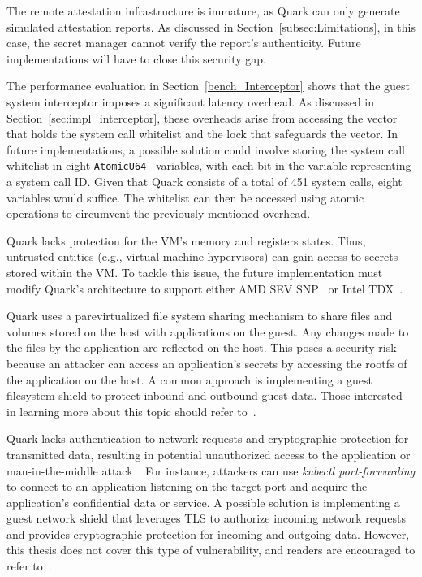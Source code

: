 The remote attestation infrastructure is immature, as Quark can only generate simulated attestation reports. As discussed in Section~\ref{subsec:Limitations}, in this case, the secret manager cannot verify the report's authenticity. Future implementations will have to close this security 
gap.

The performance evaluation in Section~\ref{bench_Interceptor} shows that the guest system interceptor imposes a significant latency overhead. As discussed in Section~\ref{sec:impl_interceptor}, these overheads arise from accessing the vector that holds the system call whitelist and the lock 
that safeguards the vector. In future implementations, a possible solution could involve storing the system call whitelist in eight \texttt{AtomicU64}~\cite*{rust_automic_u64} variables, with each bit in the variable representing a system call ID. Given that Quark consists of a total of 451 system calls, eight variables would suffice. The whitelist can then be accessed using atomic 
operations to circumvent the previously mentioned overhead.

Quark lacks protection for the VM's memory and registers states. Thus, untrusted entities (e.g., virtual machine hypervisors) can gain access to secrets stored within the VM. To tackle this issue, the future implementation must modify Quark's architecture to support either 
AMD SEV SNP~\cite*{SEV_SNP_white_book} or Intel TDX~\cite*{Intel_tdx_whitepaper}.

Quark uses a parevirtualized file system sharing mechanism to share files and volumes stored on the host with applications on the guest. Any changes made to the files by the application are reflected on the host. This poses a security risk because an attacker can access an application's secrets by 
accessing the rootfs of the application on the host. A common approach is implementing a guest filesystem shield to protect inbound and outbound guest data. Those interested in learning more about this topic should refer to~\cite*{file_system_shield}.

Quark lacks authentication to network requests and cryptographic protection for transmitted data, resulting in potential unauthorized access to the application or man-in-the-middle attack~\cite*{Man_in_the_middle_attack}. For instance, attackers can use \emph{kubectl port-forwarding} to connect to an 
application listening on the target port and acquire the application's confidential data or service. A possible solution is implementing a guest network shield that leverages TLS\cite*{tls_record_size} to authorize incoming network requests and provides cryptographic protection for incoming and 
outgoing data. However, this thesis does not cover this type of vulnerability, and readers are encouraged to refer to~\cite*{network_shiled}.

